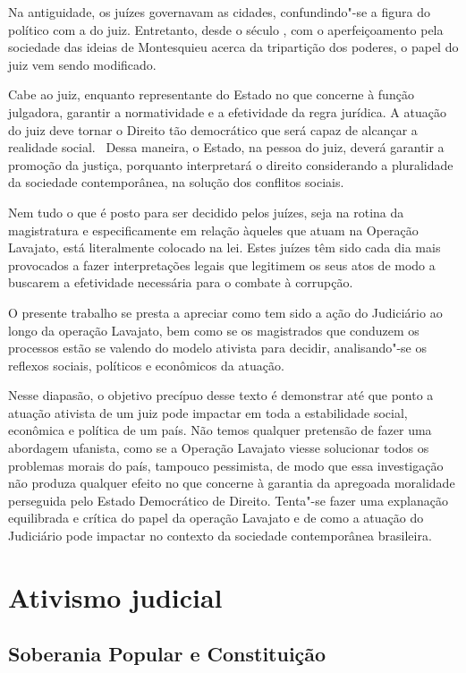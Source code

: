 Na antiguidade, os juízes governavam as cidades, confundindo"-se a figura
do político com a do juiz. Entretanto, desde o século , com o
aperfeiçoamento pela sociedade das ideias de Montesquieu acerca da
tripartição dos poderes, o papel do juiz vem sendo modificado.

Cabe ao juiz, enquanto representante do Estado no que concerne à função
julgadora, garantir a normatividade e a efetividade da regra jurídica. A
atuação do juiz deve tornar o Direito tão democrático que será capaz de
alcançar a realidade social.~ Dessa maneira, o Estado, na pessoa do
juiz, deverá garantir a promoção da justiça, porquanto interpretará o direito considerando a pluralidade da
sociedade contemporânea, na solução dos conflitos sociais.

Nem tudo o que é posto para ser decidido pelos juízes, seja na rotina da
magistratura e especificamente em relação àqueles que atuam na Operação
Lavajato, está literalmente colocado na lei. Estes juízes têm sido cada
dia mais provocados a fazer interpretações legais que legitimem os seus
atos de modo a buscarem a efetividade necessária para o combate à
corrupção.

O presente trabalho se presta a apreciar como tem sido a ação do
Judiciário ao longo da operação Lavajato, bem como se os magistrados que
conduzem os processos estão se valendo do modelo ativista para decidir,
analisando"-se os reflexos sociais, políticos e econômicos da atuação.

Nesse diapasão, o objetivo precípuo desse texto é demonstrar até que
ponto a atuação ativista de um juiz pode impactar em toda a estabilidade
social, econômica e política de um país. Não temos qualquer pretensão de
fazer uma abordagem ufanista, como se a Operação Lavajato viesse
solucionar todos os problemas morais do país, tampouco pessimista, de
modo que essa investigação não produza qualquer efeito no que concerne à
garantia da apregoada moralidade perseguida pelo Estado Democrático de
Direito. Tenta"-se fazer uma explanação equilibrada e crítica do papel da
operação Lavajato e de como a atuação do Judiciário pode impactar no
contexto da sociedade contemporânea brasileira.

\section{Ativismo judicial}

\subsection{Soberania Popular e Constituição}

